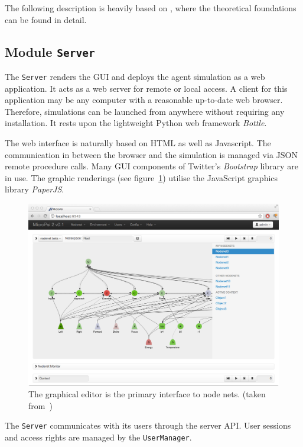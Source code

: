 The following description is heavily based on \cite{conf/agi/Bach12}, where the theoretical foundations can be found in detail.

        \subsection{Module \texttt{Server}}
The \texttt{Server} renders the GUI and deploys the agent simulation as a web application. It acts as a web server for remote or local access. A client for this application may be any computer with a reasonable up-to-date web browser. Therefore, simulations can be launched from anywhere without requiring any installation. It rests upon the lightweight Python web framework \emph{Bottle}.

The web interface is naturally based on HTML as well as Javascript. The communication in between the browser and the simulation is managed via JSON remote procedure calls. Many GUI components of Twitter's \emph{Bootstrap} library are in use. The graphic renderings (see figure~\ref{micropsi2_nodenet}) utilise the JavaScript graphics library \emph{PaperJS}. 

\begin{figure}[h]
  \centering
    \includegraphics[width=13cm]{graphics/micropsi2_nodenet}
  \caption{The graphical editor is the primary interface to node nets. (taken from~\cite{conf/agi/Bach12})}
  \label{micropsi2_nodenet}
\end{figure}

The \texttt{Server} communicates with its users through the server API. User sessions and access rights are managed by the \texttt{UserManager}.
   
